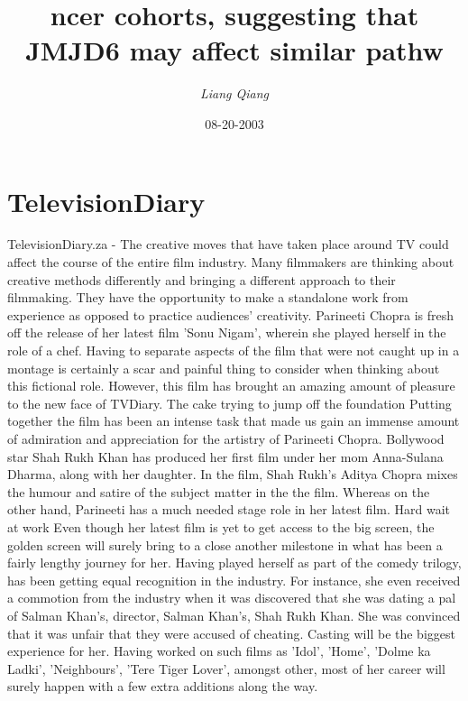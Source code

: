 \documentclass{article}%
\title{ncer cohorts, suggesting that JMJD6 may affect similar pathw}%
\author{\textit{Liang Qiang}}%
\date{08-20-2003}%
\begin{document}
%
\normalsize%
\maketitle%
\section{TelevisionDiary}%
\label{sec:TelevisionDiary}%
TelevisionDiary.za {-} The creative moves that have taken place around TV could affect the course of the entire film industry. Many filmmakers are thinking about creative methods differently and bringing a different approach to their filmmaking. They have the opportunity to make a standalone work from experience as opposed to practice audiences' creativity.\newline%
Parineeti Chopra is fresh off the release of her latest film 'Sonu Nigam', wherein she played herself in the role of a chef. Having to separate aspects of the film that were not caught up in a montage is certainly a scar and painful thing to consider when thinking about this fictional role. However, this film has brought an amazing amount of pleasure to the new face of TVDiary.\newline%
The cake trying to jump off the foundation\newline%
Putting together the film has been an intense task that made us gain an immense amount of admiration and appreciation for the artistry of Parineeti Chopra. Bollywood star Shah Rukh Khan has produced her first film under her mom Anna{-}Sulana Dharma, along with her daughter. In the film, Shah Rukh's Aditya Chopra mixes the humour and satire of the subject matter in the the film. Whereas on the other hand, Parineeti has a much needed stage role in her latest film.\newline%
Hard wait at work\newline%
Even though her latest film is yet to get access to the big screen, the golden screen will surely bring to a close another milestone in what has been a fairly lengthy journey for her. Having played herself as part of the comedy trilogy, has been getting equal recognition in the industry.\newline%
For instance, she even received a commotion from the industry when it was discovered that she was dating a pal of Salman Khan's, director, Salman Khan's, Shah Rukh Khan. She was convinced that it was unfair that they were accused of cheating.\newline%
Casting will be the biggest experience for her. Having worked on such films as 'Idol', 'Home', 'Dolme ka Ladki', 'Neighbours', 'Tere Tiger Lover', amongst other, most of her career will surely happen with a few extra additions along the way.\newline%
\end{document}
